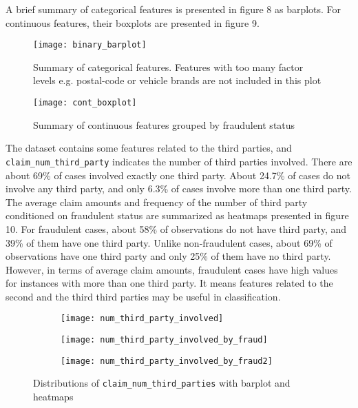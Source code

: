 \documentclass[12pt]{article}
\begin{document}
A brief summary of categorical features is presented in figure 8 as barplots. For continuous features, their boxplots are presented in figure 9.

\begin{figure}[h]
\texttt{[image: binary\_barplot]}
\vspace{-2cm}
\caption{Summary of categorical features. Features with too many factor levels e.g. postal-code or vehicle brands are not included in this plot}
\end{figure}

\begin{figure}[h]
\texttt{[image: cont\_boxplot]}
\vspace{-2cm}
\caption{Summary of continuous features grouped by fraudulent status}
\end{figure}

\clearpage
The dataset contains some features related to the third parties, and \texttt{claim\_num\_third\_party} indicates the number of third parties involved. There are about 69\% of cases involved exactly one third party. About 24.7\% of cases do not involve any third party, and only 6.3\% of cases involve more than one third party. The average claim amounts and frequency of the number of third party conditioned on fraudulent status are summarized as heatmaps presented in figure 10. For fraudulent cases, about 58\% of observations do not have third party, and 39\% of them have one third party. Unlike non-fraudulent cases, about 69\% of observations have one third party and only 25\% of them have no third party. However, in terms of average claim amounts, fraudulent cases have high values for instances with more than one third party. It means features related to the second and the third third parties may be useful in classification.\\

\vspace{-0.5cm}
\begin{figure}[h]
\centering
\begin{subfigure}{.6\textwidth}
  \centering
  \texttt{[image: num\_third\_party\_involved]}
  \label{fig:sub1}
\end{subfigure}%
\begin{subfigure}{.4\textwidth}
  \centering
  \texttt{[image: num\_third\_party\_involved\_by\_fraud]}
  \label{fig:sub2}
\end{subfigure}

\begin{subfigure}{0.7\textwidth}
  \centering
  \texttt{[image: num\_third\_party\_involved\_by\_fraud2]}
  \label{fig:sub2} 
\end{subfigure}
\caption{Distributions of \texttt{claim\_num\_third\_parties} with barplot and heatmaps}
\label{fig:eda_third_party_num}
\end{figure}
\end{document}
